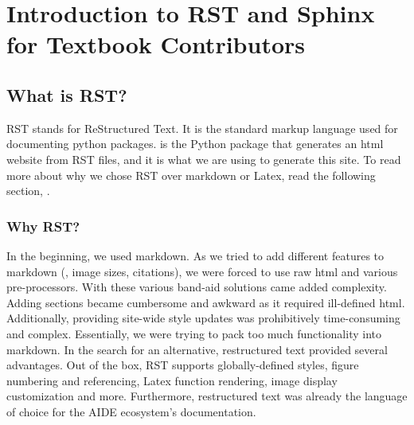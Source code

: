 \documentclass[letterpaper,10pt,english]{sphinxmanual}
\begin{document}
\chapter{Introduction to RST and Sphinx for Textbook Contributors}
\label{\detokenize{Textbook_Creation_Help/rst_intro:introduction-to-rst-and-sphinx-for-textbook-contributors}}\label{\detokenize{Textbook_Creation_Help/rst_intro:title-rst-intro}}\label{\detokenize{Textbook_Creation_Help/rst_intro::doc}}

\section{What is RST?}
\label{\detokenize{Textbook_Creation_Help/rst_intro:what-is-rst}}\label{\detokenize{Textbook_Creation_Help/rst_intro:heading-what-is-rst}}
RST stands for ReStructured Text. It is the standard markup language used for documenting python packages.  is the Python package that generates an html website from RST files, and it is what we are using to generate this site. To read more about why we chose RST over markdown or Latex, read the following section, {\hyperref[\detokenize{Textbook_Creation_Help/rst_intro:heading-why-rst}]{}}.


\subsection{Why RST?}
\label{\detokenize{Textbook_Creation_Help/rst_intro:why-rst}}\label{\detokenize{Textbook_Creation_Help/rst_intro:heading-why-rst}}
In the beginning, we used markdown. As we tried to add different features to markdown (, image sizes, citations), we were forced to use raw html and various pre-processors. With these various band-aid solutions came added complexity. Adding sections became cumbersome and awkward as it required ill-defined html. Additionally, providing site-wide style updates was prohibitively time-consuming and complex. Essentially, we were trying to pack too much functionality into markdown. In the search for an alternative, restructured text provided several advantages. Out of the box, RST supports globally-defined styles, figure numbering and referencing, Latex function rendering, image display customization and more. Furthermore, restructured text was already the language of choice for the AIDE ecosystem’s documentation.
\end{document}
